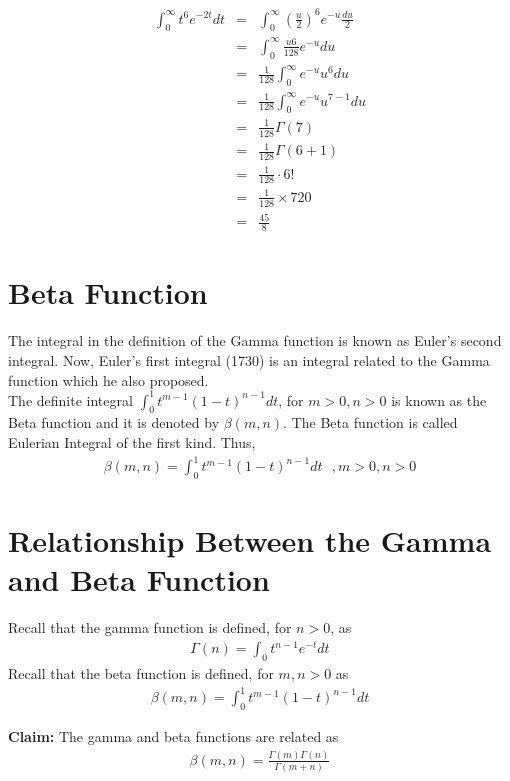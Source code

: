 \documentclass[11pt]{report}
\newcommand{\sps}{\\[0.2cm]}
\newcommand{\bt}[1]{\textbf{#1}}
\newcommand{\dsp}{\displaystyle}
\newcommand{\NI}{\noindent}
\begin{document}
	\begin{eqnarray*}
		\int_0^\infty t^6 e^{-2t} dt &=& \int_0^\infty\left(\frac{u}{2}\right)^6 e^{-u}\frac{du}{2}\sps
		&=& \int_0^\infty \frac{u6}{128}e^{-u}du\sps
		&=&\frac{1}{128}\int_0^\infty e^{-u}u^6 du\sps
		&=&\frac{1}{128}\int_0^\infty e^{-u}u^{7-1}du\sps
		&=&\frac{1}{128}\Gamma(7)\sps
		&=&\frac{1}{128}\Gamma(6+1)\sps
		&=&\frac{1}{128}\cdot 6!\sps
		&=&\frac{1}{128}\times 720\sps
		&=&\frac{45}{8}
	\end{eqnarray*}
	
	
	\section{Beta Function}
	The integral in the definition of the Gamma function is known as Euler's second integral. Now, Euler's first integral (1730) is an integral related to the Gamma function which he also proposed.\\
	
	The definite integral $\dsp\int_0^1 t^{m-1}(1-t)^{n-1}dt$, for $m>0, n>0$ is known as the Beta function and it is denoted by $\beta(m,n)$. The Beta function is called Eulerian Integral of the first kind. Thus, 
	\begin{eqnarray}
		\beta(m,n) = \int_0^1 t^{m-1}(1-t)^{n-1}dt~~~, m>0, n>0 \label{eq:3_2}
	\end{eqnarray}
	
	
	\section{Relationship Between the Gamma and Beta Function}
	Recall that the gamma function is defined, for $n>0$, as
	\begin{eqnarray*}
		\Gamma(n) = \int_0 t^{n-1}e^{-t}dt
	\end{eqnarray*}
	Recall that the beta function is defined, for $m,n>0$ as 
	\begin{eqnarray*}
		\beta(m,n) = \int_0^1 t^{m-1}(1-t)^{n-1}dt
	\end{eqnarray*}
	
	\NI \bt{Claim:} The gamma and beta functions are related as
	\begin{eqnarray}
		\beta(m,n) = \frac{\Gamma(m)\Gamma(n)}{\Gamma(m+n)}
	\end{eqnarray}
	
\end{document}
